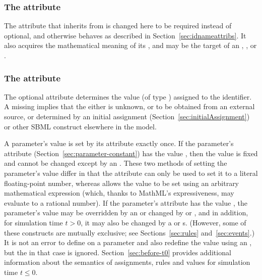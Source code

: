 \begin{blockChanged}
\subsubsection{The  attribute}

The  attribute that \Parameter inherits from \SBase is changed here to be required instead of optional, and otherwise behaves as described in Section~\ref{sec:idnameattribs}.  It also acquires the mathematical meaning of its , and may be the target of an \InitialAssignment, \EventAssignment, or \Rule.
\end{blockChanged}

\subsubsection{The  attribute}
\label{sec:parameter-value}

The optional attribute  determines the value (of type
) assigned to the identifier.  A missing
 implies that the  either is unknown, or
to be obtained from an external source, or determined by an
initial assignment (Section~\ref{sec:initialAssignment}) or 
other SBML construct elsewhere in the model.

A parameter's value is set by its  attribute exactly
once.  If the parameter's  attribute
(Section~\ref{sec:parameter-constant}) has the value ,
then the value is fixed and cannot be changed except by an
\InitialAssignment.  These two methods of setting the parameter's
value differ in that the  attribute can only be used
to set it to a literal floating-point number, whereas
\InitialAssignment allows the value to be set using an arbitrary
mathematical expression (which, thanks to MathML's expressiveness,
may evaluate to a rational number).  If the parameter's
 attribute has the value , the
parameter's value may be overridden by an \InitialAssignment or
changed by \AssignmentRule or \AlgebraicRule, and in addition, for
simulation time $t > 0$, it may also be changed by a \RateRule or
\Event{}s.  (However, some of these constructs are mutually
exclusive; see Sections~\ref{sec:rules} and~\ref{sec:events}.)  It
is not an error to define  on a parameter and also
redefine the value using an \InitialAssignment, but the
 in that case is ignored.
Section~\ref{sec:before-t0} provides additional information about
the semantics of assignments, rules and values for simulation time
$t \leq 0$.


